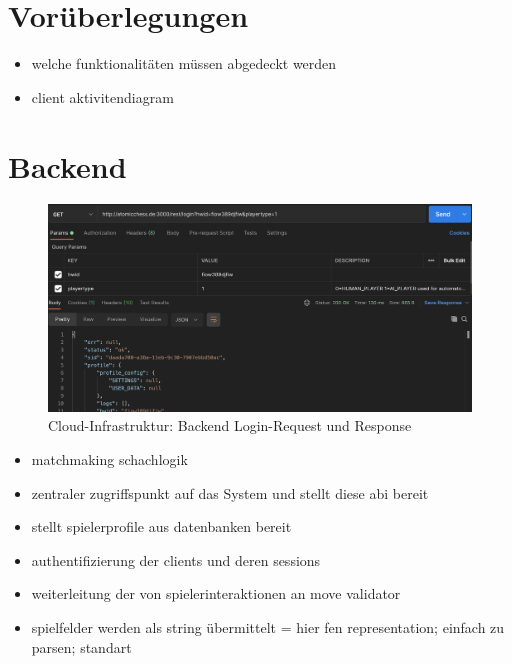 \hypertarget{voruxfcberlegungen}{%
\section{Vorüberlegungen}\label{voruxfcberlegungen}}

\begin{itemize}
\tightlist
\item
  welche funktionalitäten müssen abgedeckt werden
\item
  client aktivitendiagram
\end{itemize}

\hypertarget{backend}{%
\section{Backend}\label{backend}}

\begin{figure}
\centering
\includegraphics{images/ATC_request_example.png}
\caption{Cloud-Infrastruktur: Backend Login-Request und Response
\label{ATC_request_example}}
\end{figure}

\begin{itemize}
\tightlist
\item
  matchmaking schachlogik
\item
  zentraler zugriffspunkt auf das System und stellt diese abi bereit
\item
  stellt spielerprofile aus datenbanken bereit
\item
  authentifizierung der clients und deren sessions
\item
  weiterleitung der von spielerinteraktionen an move validator
\item
  spielfelder werden als string übermittelt = hier fen representation;
  einfach zu parsen; standart
\end{itemize}

